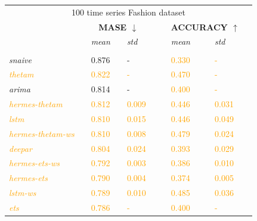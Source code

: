 \documentclass[10pt]{article} %
\begin{document}
\begin{table}
{  \begin{tabular}{l||lllll|lllll}
   \multicolumn{11}{c}{100 time series Fashion dataset}\vspace{0.5cm}\\
   &&\multicolumn{3}{c}{\textbf{MASE $\downarrow$}} &&& \multicolumn{3}{c}{\textbf{ACCURACY $\uparrow$}}&\\
   &&  \textit{mean}  && \textit{std} &&&  \textit{mean}  && \textit{std}& \\
	 \hline
	 &&&&&&&&&&\\
     \textit{snaive} && 0.876 && - &&& \textcolor{orange}{0.330} && \textcolor{orange}{-} &\\
     \textcolor{orange}{\textit{thetam}} && \textcolor{orange}{0.822} && \textcolor{orange}{-} &&& \textcolor{orange}{0.470} && \textcolor{orange}{-} &\\
     \textit{arima} && 0.814 && - &&& \textcolor{orange}{0.400} && \textcolor{orange}{-} &\\
     \textcolor{orange}{\textit{hermes-thetam}} && \textcolor{orange}{0.812} && \textcolor{orange}{0.009} &&& \textcolor{orange}{0.446} && \textcolor{orange}{0.031} &\\
     \textcolor{orange}{\textit{lstm}} && \textcolor{orange}{0.810} && \textcolor{orange}{0.015} &&& \textcolor{orange}{0.446} && \textcolor{orange}{0.049} &\\
     \textcolor{orange}{\textit{hermes-thetam-ws}} && \textcolor{orange}{0.810} && \textcolor{orange}{0.008} &&& \textcolor{orange}{0.479} && \textcolor{orange}{0.024} &\\
     \textcolor{orange}{\textit{deepar}} && \textcolor{orange}{0.804} && \textcolor{orange}{0.024} &&& \textcolor{orange}{0.393} && \textcolor{orange}{0.029} &\\
     \textcolor{orange}{\textit{hermes-ets-ws}} && \textcolor{orange}{0.792} && \textcolor{orange}{0.003} &&& \textcolor{orange}{0.386} && \textcolor{orange}{0.010} &\\
     \textcolor{orange}{\textit{hermes-ets}} && \textcolor{orange}{0.790} && \textcolor{orange}{0.004} &&& \textcolor{orange}{0.374} && \textcolor{orange}{0.005} &\\
     \textcolor{orange}{\textit{lstm-ws}} && \textcolor{orange}{0.789} && \textcolor{orange}{0.010} &&& \textcolor{orange}{0.485} && \textcolor{orange}{0.036} &\\
     \textcolor{orange}{\textit{ets}} && \textcolor{orange}{0.786} && \textcolor{orange}{-} &&& \textcolor{orange}{0.400} && \textcolor{orange}{-} &\\

\end{tabular}}
\end{table}
\end{document}
